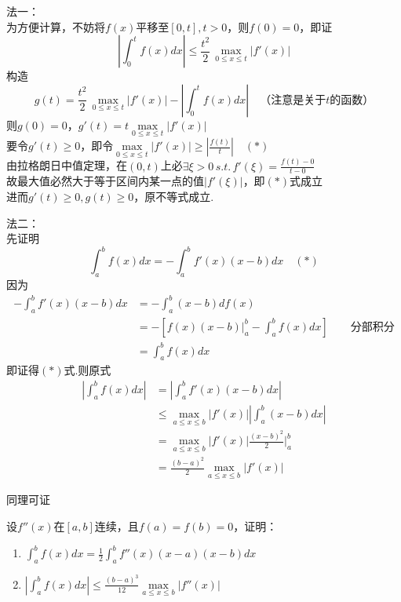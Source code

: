 \begin{analysis}法一：\\
为方便计算，不妨将$f(x)$平移至$[0,t],t>0$，则$f(0)=0$，即证
\[\left|\int_0^tf(x)dx\right|\leq\frac{t^2}{2}\,\underset{0\leq x\leq t}{\max}|f'(x)|\]
构造
\[g(t)=\frac{t^2}{2}\,\underset{0\leq x\leq t}{\max}|f'(x)|-\left|\int_0^tf(x)dx\right|\quad\mbox{（注意是关于}t\mbox{的函数）}\]
则$g(0)=0$，$g'(t)=\displaystyle t\underset{0\leq x\leq t}{\max}|f'(x)|$\\
要令$g'(t)\geq 0$，即令$\displaystyle\underset{0\leq x\leq t}{\max}|f'(x)|\geq\left|\frac{f(t)}{t}\right|\quad(*)$\\
由拉格朗日中值定理，在$(0,t)$上必$\displaystyle\exists\xi>0\,s.t.\,f'(\xi)=\frac{f(t)-0}{t-0}$\\
故最大值必然大于等于区间内某一点的值$|f'(\xi)|$，即$(*)$式成立\\
进而$g'(t)\geq 0,g(t)\geq 0$，原不等式成立.
\end{analysis}
\begin{analysis}法二：\\
先证明
\[\int_a^bf(x)dx=-\int_a^bf'(x)(x-b)dx\quad(*)\]
因为
\[\begin{aligned}
-\int_a^bf'(x)(x-b)dx &= -\int_a^b(x-b)df(x)\\
&=-\left[f(x)(x-b)\Big|_a^b-\int_a^bf(x)dx\right]\qquad\mbox{分部积分}\\
&=\int_a^bf(x)dx
\end{aligned}\]
即证得$(*)$式.则原式\\
\[\begin{aligned}
\left|\int_a^bf(x)dx\right|&=\left|\int_a^bf'(x)(x-b)dx\right|\\
&\leq\underset{a\leq x\leq b}{\max}|f'(x)|\left|\int_a^b(x-b)dx\right|\\
&=\underset{a\leq x\leq b}{\max}|f'(x)|\frac{(x-b)^2}{2}\Big|_a^b\\
&=\frac{(b-a)^2}{2}\underset{a\leq x\leq b}{\max}|f'(x)|
\end{aligned}\]
\end{analysis}
同理可证
\begin{exercise}
设$f''(x)$在$[a,b]$连续，且$f(a)=f(b)=0$，证明：
\begin{enumerate}[(1)]
	\item $\displaystyle\int_a^bf(x)dx=\frac{1}{2}\int_a^bf''(x)(x-a)(x-b)dx$
	\item $\displaystyle\left|\int_a^bf(x)dx\right|\leq\frac{(b-a)^3}{12}\underset{a\leq x\leq b}{\max}|f''(x)|$
\end{enumerate}
\end{exercise}

